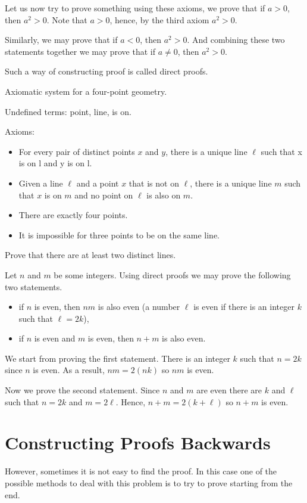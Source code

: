 Let us now try to prove something using these axioms, we prove that if $a > 0$,
then $a^2 > 0$. Note that $a > 0$, hence, by the third axiom $a^2 > 0$.

Similarly, we may prove that if $a < 0$, then $a^2 > 0$. And combining these
two statements together we may prove that if $a \neq 0$, then $a^2 > 0$.

Such a way of constructing proof is called direct proofs.

\begin{exercise}
  Axiomatic system for a four-point geometry.

  Undefined terms: point, line, is on.

  Axioms:
  \begin{itemize}
    \item For every pair of distinct points $x$ and $y$, there is a unique line
      $\ell$ such that x is on l and y is on l.
    \item Given a line $\ell$ and a point $x$ that is not on $\ell$, there is a
      unique line $m$ such that $x$ is on $m$ and no point on $\ell$ is also on
      $m$.
    \item There are exactly four points.
    \item It is impossible for three points to be on the same line.
  \end{itemize}
  Prove that there are at least two distinct lines.
\end{exercise}

Let $n$ and $m$ be some integers. Using direct proofs we may prove the
following two statements.
\begin{itemize}
  \item if $n$ is even, then $nm$ is also even (a number $\ell$ is even
    if there is an integer $k$ such that $\ell = 2k$),
  \item if $n$ is even and $m$ is even, then $n + m$ is also even.
\end{itemize}

We start from proving the first statement. There is an integer $k$ such that
$n = 2k$ since $n$ is even. As a result, $nm = 2 (nk)$ so $nm$ is even.

Now we prove the second statement. Since $n$ and $m$ are even there are $k$ and
$\ell$ such that $n = 2k$ and $m = 2\ell$. Hence, $n + m = 2 (k + \ell)$ so
$n + m$ is even.

\section{Constructing Proofs Backwards}
However, sometimes it is not easy to find the proof. In this case one of the
possible methods to deal with this problem is to try to prove starting from
the end.

